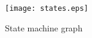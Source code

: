 \documentclass[a4paper]{article}
\author{Titouan \bsc{Christophe}}
\date{\todaay}
\title{}
\begin{document}
\begin{figure}[h]
  \texttt{[image: states.eps]}
  \caption{\label{fig:states} State machine graph}
\end{figure}
\end{document}
